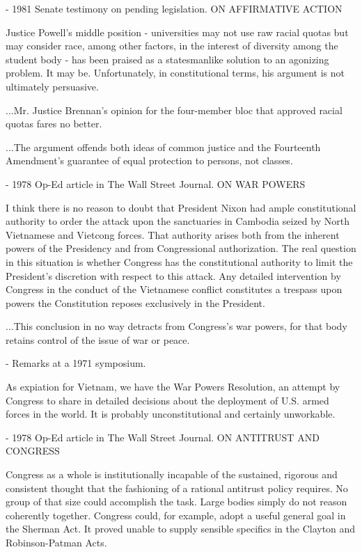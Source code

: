 - 1981 Senate testimony on pending legislation. ON AFFIRMATIVE ACTION

Justice Powell's middle position - universities may not use raw racial
quotas but may consider race, among other factors, in the interest of
diversity among the student body - has been praised as a statesmanlike
solution to an agonizing problem. It may be. Unfortunately, in
constitutional terms, his argument is not ultimately persuasive.

...Mr. Justice Brennan's opinion for the four-member bloc that approved
racial quotas fares no better.

...The argument offends both ideas of common justice and the Fourteenth
Amendment's guarantee of equal protection to persons, not classes.

- 1978 Op-Ed article in The Wall Street Journal. ON WAR POWERS

I think there is no reason to doubt that President Nixon had ample
constitutional authority to order the attack upon the sanctuaries in
Cambodia seized by North Vietnamese and Vietcong forces. That authority
arises both from the inherent powers of the Presidency and from
Congressional authorization. The real question in this situation is
whether Congress has the constitutional authority to limit the
President's discretion with respect to this attack. Any detailed
intervention by Congress in the conduct of the Vietnamese conflict
constitutes a trespass upon powers the Constitution reposes exclusively
in the President.

...This conclusion in no way detracts from Congress's war powers, for
that body retains control of the issue of war or peace.

- Remarks at a 1971 symposium.

As expiation for Vietnam, we have the War Powers Resolution, an attempt
by Congress to share in detailed decisions about the deployment of U.S.
armed forces in the world. It is probably unconstitutional and certainly
unworkable.

- 1978 Op-Ed article in The Wall Street Journal. ON ANTITRUST AND
CONGRESS

Congress as a whole is institutionally incapable of the sustained,
rigorous and consistent thought that the fashioning of a rational
antitrust policy requires. No group of that size could accomplish the
task. Large bodies simply do not reason coherently together. Congress
could, for example, adopt a useful general goal in the Sherman Act. It
proved unable to supply sensible specifics in the Clayton and
Robinson-Patman Acts.

